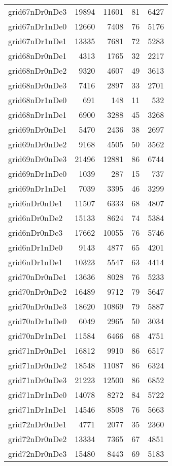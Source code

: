 \begin{longtable}{lrrrr}
grid67nDr0nDe3 & 19894 & 11601 & 81 & 6427 \\
grid67nDr1nDe0 & 12660 & 7408 & 76 & 5176 \\
grid67nDr1nDe1 & 13335 & 7681 & 72 & 5283 \\
grid68nDr0nDe1 & 4313 & 1765 & 32 & 2217 \\
grid68nDr0nDe2 & 9320 & 4607 & 49 & 3613 \\
grid68nDr0nDe3 & 7416 & 2897 & 33 & 2701 \\
grid68nDr1nDe0 & 691 & 148 & 11 & 532 \\
grid68nDr1nDe1 & 6900 & 3288 & 45 & 3268 \\
grid69nDr0nDe1 & 5470 & 2436 & 38 & 2697 \\
grid69nDr0nDe2 & 9168 & 4505 & 50 & 3562 \\
grid69nDr0nDe3 & 21496 & 12881 & 86 & 6744 \\
grid69nDr1nDe0 & 1039 & 287 & 15 & 737 \\
grid69nDr1nDe1 & 7039 & 3395 & 46 & 3299 \\
grid6nDr0nDe1 & 11507 & 6333 & 68 & 4807 \\
grid6nDr0nDe2 & 15133 & 8624 & 74 & 5384 \\
grid6nDr0nDe3 & 17662 & 10055 & 76 & 5746 \\
grid6nDr1nDe0 & 9143 & 4877 & 65 & 4201 \\
grid6nDr1nDe1 & 10323 & 5547 & 63 & 4414 \\
grid70nDr0nDe1 & 13636 & 8028 & 76 & 5233 \\
grid70nDr0nDe2 & 16489 & 9712 & 79 & 5647 \\
grid70nDr0nDe3 & 18620 & 10869 & 79 & 5887 \\
grid70nDr1nDe0 & 6049 & 2965 & 50 & 3034 \\
grid70nDr1nDe1 & 11584 & 6466 & 68 & 4751 \\
grid71nDr0nDe1 & 16812 & 9910 & 86 & 6517 \\
grid71nDr0nDe2 & 18548 & 11087 & 86 & 6324 \\
grid71nDr0nDe3 & 21223 & 12500 & 86 & 6852 \\
grid71nDr1nDe0 & 14078 & 8272 & 84 & 5722 \\
grid71nDr1nDe1 & 14546 & 8508 & 76 & 5663 \\
grid72nDr0nDe1 & 4771 & 2077 & 35 & 2360 \\
grid72nDr0nDe2 & 13334 & 7365 & 67 & 4851 \\
grid72nDr0nDe3 & 15480 & 8443 & 69 & 5183 \\

\end{longtable}
